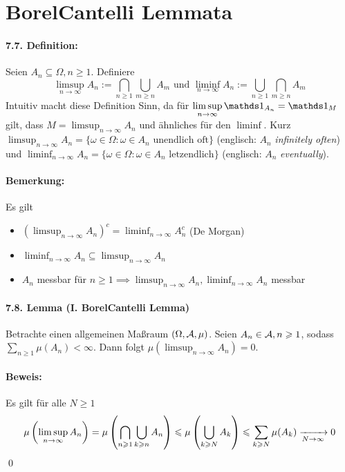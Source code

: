 \section*{Borel\textendash Cantelli Lemmata}

\paragraph{7.7. Definition:}Seien $A_n\subseteq\Omega, n\geq1$. Definiere
$$\limsup_{n\to\infty}A_n:=\bigcap_{n\geq1}\bigcup_{m\geq n}A_m\text{ und }\liminf_{n\to\infty}A_n:=\bigcup_{n\geq1}\bigcap_{m\geq n}A_m$$
Intuitiv macht diese Definition Sinn, da f\"ur $\displaystyle\limsup_{n\to\infty}\ind{A_n}=\ind{M}$ gilt, dass $M=\displaystyle\limsup_{n\to\infty}A_n$ und \"ahnliches f\"ur den $\liminf$. Kurz $\displaystyle\limsup_{n\to\infty}A_n=\{\omega\in\Omega:\omega\in A_n\text{ unendlich oft}\}$ (englisch: $A_n$ \textit{infinitely often}) und $\displaystyle\liminf_{n\to\infty}A_n=\{\omega\in\Omega:\omega\in A_n \text{ letzendlich}\}$ (englisch: $A_n$ \textit{eventually}). 

\paragraph{Bemerkung:}Es gilt
\begin{itemize}
    \item $\displaystyle\left(\limsup_{n\to\infty}A_n\right)^c=\liminf_{n\to\infty}A_n^c$ (De Morgan)
    \item $\displaystyle\liminf_{n\to\infty}A_n\subseteq\limsup_{n\to\infty}A_n$
    \item $A_n$ messbar f\"ur $n\geq1\implies\displaystyle\limsup_{n\to\infty}A_n,\liminf_{n\to\infty}A_n$ messbar
\end{itemize}

\paragraph{7.8. Lemma (I. Borel\textendash Cantelli Lemma)}Betrachte einen allgemeinen Ma\ss{}raum $(\Omega,\mathcal{A},\mu)$. Seien $A_n\in\mathcal{A},n\geqslant1$, sodass $\sum_{n\geq1}\mu(A_n)<\infty$. Dann folgt $\mu\left(\limsup_{n\to\infty}A_n\right)=0$.

\paragraph{Beweis:}Es gilt f\"ur alle $N\geq1$
$$\mu\left(\limsup_{n\to\infty}A_n\right)=\mu\left(\bigcap_{n\geq1}\bigcup_{k\geq n}A_n\right)\leq\mu\left(\bigcup_{k\geq N}A_k\right)\leq\sum_{k\geq N}\mu(A_k)\nto{}{N\to\infty}0$$
\qed

